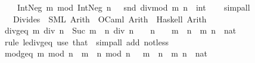\begin{isabellebody}
\ \ \ \ {\isachardoublequoteopen}Int{\isachardot}{\kern0pt}Neg\ m\ mod\ Int{\isachardot}{\kern0pt}Neg\ n\ {\isacharequal}{\kern0pt}\ {\isacharminus}{\kern0pt}\ {\isacharparenleft}{\kern0pt}snd\ {\isacharparenleft}{\kern0pt}divmod\ m\ n{\isacharparenright}{\kern0pt}\ {\isacharcolon}{\kern0pt}{\isacharcolon}{\kern0pt}\ int{\isacharparenright}{\kern0pt}{\isachardoublequoteclose}\isanewline
%
\isadelimproof
\ \ %
\endisadelimproof
%
\isatagproof
{}\isamarkupfalse%
\ simp{\isacharunderscore}{\kern0pt}all%
\endisatagproof
{\isafoldproof}%
%
\isadelimproof
\isanewline
%
\endisadelimproof
\isanewline
{}\isamarkupfalse%
\isanewline
\ \ \ Divides\ {\isasymrightharpoonup}\ {\isacharparenleft}{\kern0pt}SML{\isacharparenright}{\kern0pt}\ Arith\ \ {\isacharparenleft}{\kern0pt}OCaml{\isacharparenright}{\kern0pt}\ Arith\ \ {\isacharparenleft}{\kern0pt}Haskell{\isacharparenright}{\kern0pt}\ Arith%
\isadelimdocument
%
\endisadelimdocument
%
\isatagdocument
%
\isamarkuptrue%
%
\endisatagdocument
{\isafolddocument}%
%
\isadelimdocument
%
\endisadelimdocument
{}\isamarkupfalse%
\ div{\isacharunderscore}{\kern0pt}geq{\isacharcolon}{\kern0pt}\ {\isachardoublequoteopen}m\ div\ n\ {\isacharequal}{\kern0pt}\ Suc\ {\isacharparenleft}{\kern0pt}{\isacharparenleft}{\kern0pt}m\ {\isacharminus}{\kern0pt}\ n{\isacharparenright}{\kern0pt}\ div\ n{\isacharparenright}{\kern0pt}{\isachardoublequoteclose}\ \ {\isachardoublequoteopen}{}\ {\isacharless}{\kern0pt}\ n{\isachardoublequoteclose}\ \ {\isachardoublequoteopen}\ {\isasymnot}\ m\ {\isacharless}{\kern0pt}\ n{\isachardoublequoteclose}\ \ m\ n\ {\isacharcolon}{\kern0pt}{\isacharcolon}{\kern0pt}\ nat\isanewline
%
\isadelimproof
\ \ %
\endisadelimproof
%
\isatagproof
{}\isamarkupfalse%
\ {\isacharparenleft}{\kern0pt}rule\ le{\isacharunderscore}{\kern0pt}div{\isacharunderscore}{\kern0pt}geq{\isacharparenright}{\kern0pt}\ {\isacharparenleft}{\kern0pt}use\ that\ \ {\isacartoucheopen}simp{\isacharunderscore}{\kern0pt}all\ add{\isacharcolon}{\kern0pt}\ not{\isacharunderscore}{\kern0pt}less{\isacartoucheclose}{\isacharparenright}{\kern0pt}%
\endisatagproof
{\isafoldproof}%
%
\isadelimproof
\isanewline
%
\endisadelimproof
\isanewline
{}\isamarkupfalse%
\ mod{\isacharunderscore}{\kern0pt}geq{\isacharcolon}{\kern0pt}\ {\isachardoublequoteopen}m\ mod\ n\ {\isacharequal}{\kern0pt}\ {\isacharparenleft}{\kern0pt}m\ {\isacharminus}{\kern0pt}\ n{\isacharparenright}{\kern0pt}\ mod\ n{\isachardoublequoteclose}\ \ {\isachardoublequoteopen}{\isasymnot}\ m\ {\isacharless}{\kern0pt}\ n{\isachardoublequoteclose}\ \ m\ n\ {\isacharcolon}{\kern0pt}{\isacharcolon}{\kern0pt}\ nat\isanewline

\end{isabellebody}
